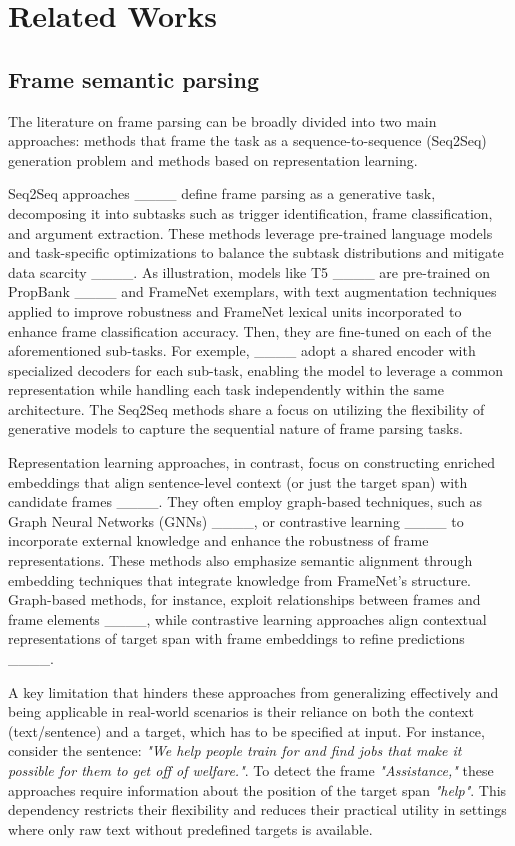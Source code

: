 \section{Related Works}
\subsection{Frame semantic parsing}
The literature on frame parsing can be broadly divided into two main approaches: methods that frame the task as a sequence-to-sequence (Seq2Seq) generation problem and methods based on representation learning. 

Seq2Seq approaches ____ define frame parsing as a generative task, decomposing it into subtasks such as trigger identification, frame classification, and argument extraction. These methods leverage pre-trained language models and task-specific optimizations to balance the subtask distributions and mitigate data scarcity ____. As illustration, models like T5 ____ are pre-trained on PropBank ____ and FrameNet exemplars, with text augmentation techniques applied to improve robustness and FrameNet lexical units incorporated to enhance frame classification accuracy. Then, they are fine-tuned on each of the aforementioned sub-tasks. 
For exemple, ____ adopt a shared encoder with specialized decoders for each sub-task, enabling the model to leverage a common representation while handling each task independently within the same architecture. The Seq2Seq methods share a focus on utilizing the flexibility of generative models to capture the sequential nature of frame parsing tasks. 

Representation learning approaches, in contrast, focus on constructing enriched embeddings that align sentence-level context (or just the target span) with candidate frames ____. They often employ graph-based techniques, such as Graph Neural Networks (GNNs) ____, or contrastive learning ____ to incorporate external knowledge and enhance the robustness of frame representations. These methods also emphasize semantic alignment through embedding techniques that integrate knowledge from FrameNet's structure. Graph-based methods, for instance, exploit relationships between frames and frame elements ____, while contrastive learning approaches align contextual representations of target span with frame embeddings to refine predictions  ____.

A key limitation that hinders these approaches from generalizing effectively and being applicable in real-world scenarios is their reliance on both the context (text/sentence) and a target, which has to be specified at input. For instance, consider the sentence: \textit{"We help people train for and find jobs that make it possible for them to get off of welfare."}. To detect the frame \textit{"Assistance,"} these approaches require information about the position of the target span %
\textit{"help"}. This dependency restricts their flexibility and reduces their practical utility in settings where only raw text without predefined targets is available.

